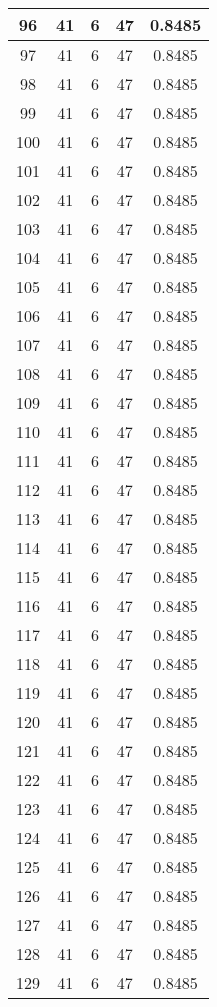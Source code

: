 \documentclass[letterpaper, 12pt]{article}
\begin{document}
\begin{longtable}{|c|c|c|c|c|}
\hline
96 & 41 & 6 & 47 & 0.8485 \\
\hline
97 & 41 & 6 & 47 & 0.8485 \\
\hline
98 & 41 & 6 & 47 & 0.8485 \\
\hline
99 & 41 & 6 & 47 & 0.8485 \\
\hline
100 & 41 & 6 & 47 & 0.8485 \\
\hline
101 & 41 & 6 & 47 & 0.8485 \\
\hline
102 & 41 & 6 & 47 & 0.8485 \\
\hline
103 & 41 & 6 & 47 & 0.8485 \\
\hline
104 & 41 & 6 & 47 & 0.8485 \\
\hline
105 & 41 & 6 & 47 & 0.8485 \\
\hline
106 & 41 & 6 & 47 & 0.8485 \\
\hline
107 & 41 & 6 & 47 & 0.8485 \\
\hline
108 & 41 & 6 & 47 & 0.8485 \\
\hline
109 & 41 & 6 & 47 & 0.8485 \\
\hline
110 & 41 & 6 & 47 & 0.8485 \\
\hline
111 & 41 & 6 & 47 & 0.8485 \\
\hline
112 & 41 & 6 & 47 & 0.8485 \\
\hline
113 & 41 & 6 & 47 & 0.8485 \\
\hline
114 & 41 & 6 & 47 & 0.8485 \\
\hline
115 & 41 & 6 & 47 & 0.8485 \\
\hline
116 & 41 & 6 & 47 & 0.8485 \\
\hline
117 & 41 & 6 & 47 & 0.8485 \\
\hline
118 & 41 & 6 & 47 & 0.8485 \\
\hline
119 & 41 & 6 & 47 & 0.8485 \\
\hline
120 & 41 & 6 & 47 & 0.8485 \\
\hline
121 & 41 & 6 & 47 & 0.8485 \\
\hline
122 & 41 & 6 & 47 & 0.8485 \\
\hline
123 & 41 & 6 & 47 & 0.8485 \\
\hline
124 & 41 & 6 & 47 & 0.8485 \\
\hline
125 & 41 & 6 & 47 & 0.8485 \\
\hline
126 & 41 & 6 & 47 & 0.8485 \\
\hline
127 & 41 & 6 & 47 & 0.8485 \\
\hline
128 & 41 & 6 & 47 & 0.8485 \\
\hline
129 & 41 & 6 & 47 & 0.8485 \\

\end{longtable}
\end{document}
